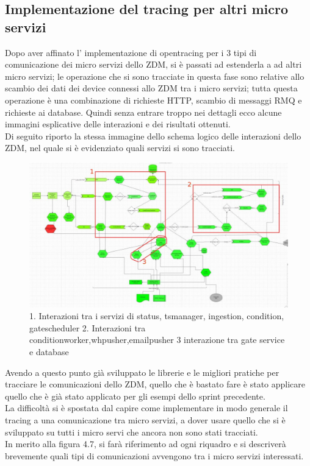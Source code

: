 \documentclass[a4paper,12pt,titlepage,italian,openany]{report}
\begin{document}
\subsection{Implementazione del tracing per altri micro servizi}
Dopo aver affinato l' implementazione di  opentracing per i 3 tipi di comunicazione dei micro servizi dello ZDM\cite{zdm:1}, si è passati ad estenderla a ad altri micro servizi;
le operazione che si sono tracciate in questa fase sono relative allo scambio dei dati dei device connessi allo ZDM\cite{zdm:1} tra i micro servizi; tutta questa operazione è una combinazione di richieste HTTP, scambio di messaggi RMQ e richieste ai database. Quindi senza entrare troppo nei dettagli ecco alcune immagini esplicative delle interazioni e dei risultati ottenuti.\\
Di seguito riporto la stessa immagine dello schema logico delle interazioni dello ZDM\cite{zdm:1}, nel quale si è evidenziato quali servizi si sono tracciati.
\begin{figure}[H]
    \includegraphics[scale=0.3]{61.jpg}
    \centering
    \caption{1. Interazioni tra i servizi di status, tsmanager, ingestion, condition, gatescheduler 2. Interazioni tra conditionworker,whpusher,emailpusher 3 interazione tra gate service e database}
\end{figure}

Avendo a questo punto già sviluppato le librerie e le migliori pratiche per tracciare le comunicazioni dello ZDM\cite{zdm:1}, quello che è bastato fare è stato applicare quello che è già stato applicato per gli esempi dello sprint precedente.
\\ La difficoltà si è spostata dal capire come implementare in modo generale il tracing a una comunicazione tra micro servizi, a dover usare quello che si è sviluppato su tutti i micro servi che ancora non sono stati tracciati.\\
In merito alla figura 4.7, si farà riferimento ad ogni riquadro e si descriverà brevemente quali tipi di comunicazioni avvengono tra i micro servizi interessati.
\end{document}
